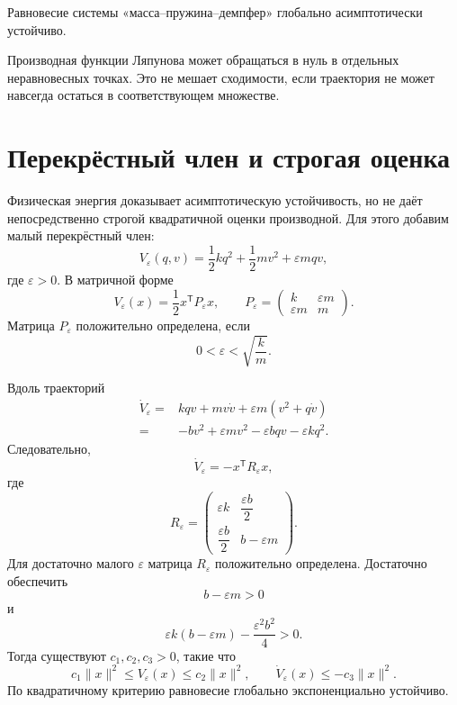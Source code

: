 \begin{theorem}
Равновесие системы «масса--пружина--демпфер» глобально
асимптотически устойчиво.
\end{theorem}

Производная функции Ляпунова может обращаться в нуль в отдельных
неравновесных точках. Это не мешает сходимости, если траектория не
может навсегда остаться в соответствующем множестве.

\section{Перекрёстный член и строгая оценка}

Физическая энергия доказывает асимптотическую устойчивость, но не
даёт непосредственно строгой квадратичной оценки производной. Для
этого добавим малый перекрёстный член:
\[
    V_\varepsilon(q,v)
    =
    \frac12kq^2
    +
    \frac12mv^2
    +
    \varepsilon m qv,
\]
где \(\varepsilon>0\). В матричной форме
\[
    V_\varepsilon(x)
    =
    \frac12x^{\mathsf T}P_\varepsilon x,
    \qquad
    P_\varepsilon
    =
    \begin{pmatrix}
        k&\varepsilon m\\
        \varepsilon m&m
    \end{pmatrix}.
\]
Матрица \(P_\varepsilon\) положительно определена, если
\[
    0<\varepsilon<\sqrt{\frac{k}{m}}.
\]

Вдоль траекторий
\[
\begin{aligned}
    \dot V_\varepsilon
    ={}&
    kqv+mv\dot v
    +
    \varepsilon m(v^2+q\dot v)
    \\
    ={}&
    -bv^2+
    \varepsilon mv^2-
    \varepsilon bqv-
    \varepsilon kq^2.
\end{aligned}
\]
Следовательно,
\[
    \dot V_\varepsilon
    =
    -x^{\mathsf T}R_\varepsilon x,
\]
где
\[
    R_\varepsilon
    =
    \begin{pmatrix}
        \varepsilon k&\dfrac{\varepsilon b}{2}\\[2mm]
        \dfrac{\varepsilon b}{2}&b-\varepsilon m
    \end{pmatrix}.
\]
Для достаточно малого \(\varepsilon\) матрица \(R_\varepsilon\)
положительно определена. Достаточно обеспечить
\[
    b-\varepsilon m>0
\]
и
\[
    \varepsilon k(b-\varepsilon m)
    -
    \frac{\varepsilon^2b^2}{4}
    >0.
\]
Тогда существуют \(c_1,c_2,c_3>0\), такие что
\[
    c_1\lVert x\rVert^2
    \le
    V_\varepsilon(x)
    \le
    c_2\lVert x\rVert^2,
    \qquad
    \dot V_\varepsilon(x)
    \le
    -c_3\lVert x\rVert^2.
\]
По квадратичному критерию равновесие глобально экспоненциально
устойчиво.

